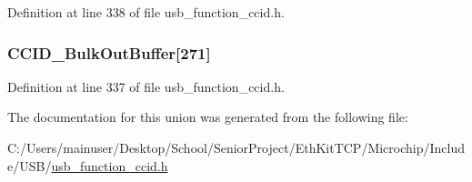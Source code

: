 Definition at line 338 of file usb\+\_\+function\+\_\+ccid.\+h.

\hypertarget{union_u_s_b___c_c_i_d___b_u_f_f_e_r_a5a919bd320cab81f68ecb7808b24228a}{}
\subsubsection[{C\+C\+I\+D\+\_\+\+Bulk\+Out\+Buffer}]{ C\+C\+I\+D\+\_\+\+Bulk\+Out\+Buffer\mbox{[}271\mbox{]}}\label{union_u_s_b___c_c_i_d___b_u_f_f_e_r_a5a919bd320cab81f68ecb7808b24228a}


Definition at line 337 of file usb\+\_\+function\+\_\+ccid.\+h.



The documentation for this union was generated from the following file\+:\begin{DoxyCompactItemize}
\item 
C\+:/\+Users/mainuser/\+Desktop/\+School/\+Senior\+Project/\+Eth\+Kit\+T\+C\+P/\+Microchip/\+Include/\+U\+S\+B/\hyperlink{usb__function__ccid_8h}{usb\+\_\+function\+\_\+ccid.\+h}\end{DoxyCompactItemize}
